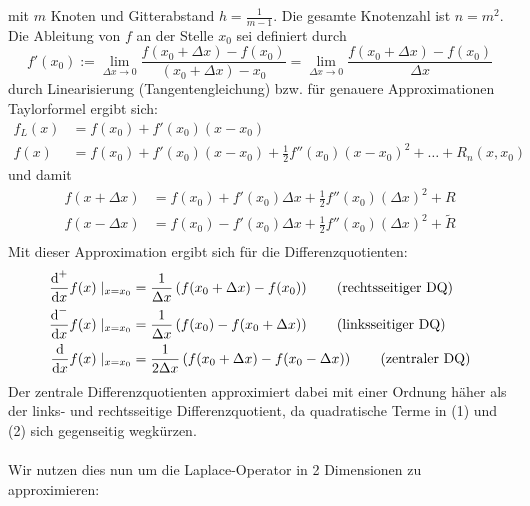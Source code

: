 \begin{egbox}
\begin{center}
        \end{center}
        mit $m$ Knoten und Gitterabstand $h=\tfrac{1}{m-1}$. Die gesamte Knotenzahl ist $n=m^2$. \\
        Die Ableitung von $f$ an der Stelle $x_0$ sei definiert durch
        \[f'(x_0) := 
        \lim_{\Delta x \rightarrow 0} \dfrac{f(x_0+\Delta x)-f(x_0)}{(x_0+\Delta x) - x_0} 
        = \lim_{\Delta x \rightarrow 0} \dfrac{f(x_0+\Delta x)-f(x_0)}{\Delta x} \]
        durch Linearisierung (Tangentengleichung) bzw. für genauere Approximationen Taylorformel ergibt sich:
        \begin{align*}
            f_L(x) &= f(x_0) + f'(x_0)(x-x_0) \\
            f(x) &= f(x_0) + f'(x_0)(x-x_0) + \tfrac{1}{2} f''(x_0)(x-x_0)^2 + \dotsc + R_n(x,x_0)
        \end{align*}
        und damit 
        \begin{align*}
            f(x+\Delta x) &= f(x_0) + f'(x_0)\Delta x + \tfrac{1}{2}f''(x_0)(\Delta x)^2 + R \tag{1}\\
            f(x-\Delta x) &= f(x_0) - f'(x_0)\Delta x + \tfrac{1}{2}f''(x_0)(\Delta x)^2 + \tilde{R} \tag{2} \\
        \end{align*}
        Mit dieser Approximation ergibt sich für die Differenzquotienten:
        \begin{align*}
            \dfrac{\diff^+}{\diff x} f(x)\mid_{x=x_0} &= \dfrac{1}{\Delta x}\left(f(x_0+\Delta x) - f(x_0)\right) 
            \tag{rechtsseitiger DQ}\\
            \dfrac{\diff^-}{\diff x} f(x)\mid_{x=x_0} &= \dfrac{1}{\Delta x}\left(f(x_0)-f(x_0+\Delta x)\right) 
            \tag{linksseitiger DQ}\\
            \dfrac{\diff}{\diff x} f(x)\mid_{x=x_0} 
            &= \dfrac{1}{2\Delta x}\left(f(x_0+\Delta x) - f(x_0-\Delta x)\right)\tag{zentraler DQ}
        \end{align*}
        Der zentrale Differenzquotienten approximiert dabei mit einer Ordnung häher als der links- und rechtsseitige 
        Differenzquotient, da quadratische Terme in (1) und (2) sich gegenseitig wegkürzen. \\ \\
        Wir nutzen dies nun um die Laplace-Operator in 2 Dimensionen zu approximieren: \\
        \begin{center}
\begin{tikzpicture}[scale=0.5, thick, every node/.style={font=\large}]


\end{tikzpicture}
\end{center}
\end{egbox}
